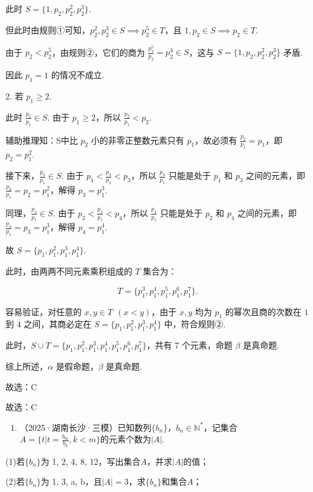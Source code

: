 \documentclass[11pt,a4paper]{ctexart}
\begin{document}
此时 \(S=\{1,p_{2},p_{2}^{2},p_{2}^{3}\}\).

但此时由规则①可知，\(p_2^2, p_2^3 \in S \implies p_2^5 \in T\)，且 \(1, p_2 \in S \implies p_2 \in T\).

由于 \(p_2 < p_2^5\)，由规则②，它们的商为 \(\frac{p_2^5}{p_2} = p_2^4 \in S\)，这与 \(S=\{1,p_{2},p_{2}^{2},p_{2}^{3}\}\) 矛盾.

因此 \(p_1 = 1\) 的情况不成立.

2. 若 \(p_{1}\geq 2\).

此时 \(\frac{p_{2}}{p_{1}} \in S\). 由于 \(p_1 \ge 2\)，所以 \(\frac{p_2}{p_1} < p_2\).

辅助推理知：S中比 \(p_2\) 小的非零正整数元素只有 \(p_1\)，故必须有 \(\frac{p_2}{p_1} = p_1\)，即 \(p_2 = p_1^2\).

接下来，\(\frac{p_3}{p_1} \in S\). 由于 \(p_1 < \frac{p_3}{p_1} < p_3\)，所以 \(\frac{p_3}{p_1}\) 只能是处于 \(p_1\) 和 \(p_3\) 之间的元素，即 \(\frac{p_3}{p_1} = p_2 = p_1^2\)，解得 \(p_3 = p_1^3\).

同理，\(\frac{p_4}{p_1} \in S\). 由于 \(p_2 < \frac{p_4}{p_1} < p_4\)，所以 \(\frac{p_4}{p_1}\) 只能是处于 \(p_2\) 和 \(p_4\) 之间的元素，即 \(\frac{p_4}{p_1} = p_3 = p_1^3\)，解得 \(p_4 = p_1^4\).

故 \(S = \{p_1, p_1^2, p_1^3, p_1^4\}\).

此时，由两两不同元素乘积组成的 $T$ 集合为：

\[
T = \{p_1^3, p_1^4, p_1^5, p_1^6, p_1^7\}.
\]

容易验证，对任意的 \(x, y \in T\ \ (x < y)\)，由于 \(x, y\) 均为 $p_1$ 的幂次且商的次数在 $1$ 到 $4$ 之间，其商必定在 \(S = \{p_1, p_1^2, p_1^3, p_1^4\}\) 中，符合规则②.

此时，\(S \cup T = \{p_1, p_1^2, p_1^3, p_1^4, p_1^5, p_1^6, p_1^7\}\)，共有 7 个元素，命题 \(\beta\) 是真命题.

综上所述，\(\alpha\) 是假命题，\(\beta\) 是真命题.

故选：C

故选：C

\begin{enumerate}[label=\arabic*., leftmargin=*, start=23]
\item （2025·湖南长沙·三模）已知数列\(\{b_n\}\)，\(b_n \in \mathbb{N}^*\)，记集合\(A = \{t | t = \frac{b_m}{b_k}, k < m\}\)的元素个数为\(|A|\).
\end{enumerate}

(1)若\(\{b_n\}\)为 1, 2, 4, 8, 12，写出集合\(A\)，并求\(|A|\)的值；

(2)若\(\{b_n\}\)为 1, 3, a, b，且\(|A| = 3\)，求\(\{b_n\}\)和集合\(A\)；
\end{document}
